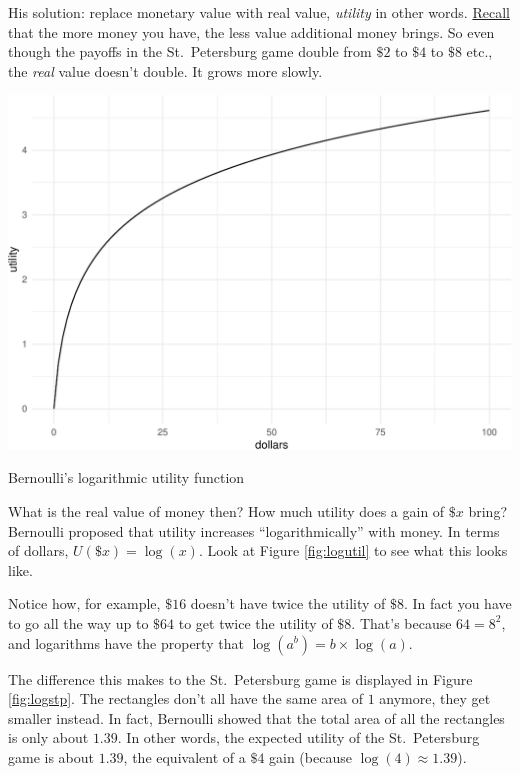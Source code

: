 \documentclass[justified]{tufte-book}
\renewcommand{\u}{U}
\theoremstyle{definition}
\theoremstyle{definition}
\theoremstyle{definition}
\theoremstyle{remark}
\begin{document}
His solution: replace monetary value with real value, \emph{utility} in other words. \protect\hyperlink{utility}{Recall} that the more money you have, the less value additional money brings. So even though the payoffs in the St.~Petersburg game double from \(\$2\) to \(\$4\) to \(\$8\) etc., the \emph{real} value doesn't double. It grows more slowly.

\begin{marginfigure}
\includegraphics{_main_files/figure-latex/logutil-1} \caption[Bernoulli's logarithmic utility function]{Bernoulli's logarithmic utility function}\label{fig:logutil}
\end{marginfigure}

What is the real value of money then? How much utility does a gain of \(\$x\) bring? Bernoulli proposed that utility increases ``logarithmically'' with money. In terms of dollars, \(\u(\$x)=\log(x)\). Look at Figure \ref{fig:logutil} to see what this looks like.

Notice how, for example, \(\$16\) doesn't have twice the utility of \(\$8\). In fact you have to go all the way up to \(\$64\) to get twice the utility of \(\$8\). That's because \(64 = 8^2\), and logarithms have the property that \(\log(a^b) = b \times \log(a)\).

The difference this makes to the St.~Petersburg game is displayed in Figure \ref{fig:logstp}. The rectangles don't all have the same area of \(1\) anymore, they get smaller instead. In fact, Bernoulli showed that the total area of all the rectangles is only about \(1.39\). In other words, the expected utility of the St.~Petersburg game is about \(1.39\), the equivalent of a \(\$4\) gain (because \(\log(4) \approx 1.39\)).
\end{document}

